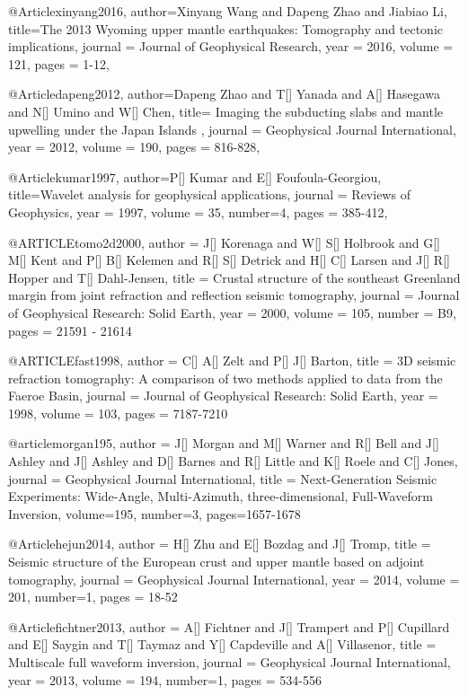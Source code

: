 @Article{xinyang2016,
  author={Xinyang Wang and Dapeng Zhao and Jiabiao Li},
  title={The 2013 Wyoming upper mantle earthquakes: Tomography and tectonic implications},
  journal = 	 {Journal of Geophysical Research},
  year = 	 2016,
  volume =	 121,
  pages =	 {1-12},
}

@Article{dapeng2012,
  author={Dapeng Zhao and T[] Yanada and A[] Hasegawa and N[] Umino and W[] Chen},
  title={ Imaging the subducting slabs and mantle upwelling under the Japan Islands },
  journal = 	 {Geophysical Journal International},
  year = 	 2012,
  volume =	 190,
  pages =	 {816-828},
}


@Article{kumar1997,
  author={P[] Kumar and E[] Foufoula-Georgiou},
  title={Wavelet analysis for geophysical applications},
  journal = 	 {Reviews of Geophysics},
  year = 	 1997,
  volume =	 35,
  number=4,
  pages =	 {385-412},
}

@ARTICLE{tomo2d2000,
  author = {J[] Korenaga and W[] S[] Holbrook and G[] M[] Kent and P[] B[] Kelemen and R[] S[] Detrick and H[] C[] Larsen and J[] R[] Hopper and T[] Dahl-Jensen},
  title = {Crustal structure of the southeast Greenland margin from joint refraction and reflection seismic tomography},
  journal = {Journal of Geophysical Research: Solid Earth},
  year = {2000},
  volume = {105},
  number = B9,
  pages = {21591 - 21614}
}

@ARTICLE{fast1998,
  author = {C[] A[] Zelt and P[] J[] Barton},
  title = {3D seismic refraction tomography: A comparison of two methods applied to data from the Faeroe Basin},
  journal = {Journal of Geophysical Research: Solid Earth},
  year = {1998},
  volume = {103},
  pages = {7187-7210}
}


@article{morgan195,
author = {J[] Morgan and M[] Warner and R[] Bell and J[] Ashley and J[] Ashley and D[] Barnes and R[] Little and K[] Roele and C[] Jones},
journal = {Geophysical Journal International},
title = {Next-Generation Seismic Experiments: Wide-Angle, Multi-Azimuth, three-dimensional, Full-Waveform Inversion},
volume=195,
number=3,
pages=1657-1678
}

@Article{hejun2014,
  author = 	 {H[] Zhu and E[] Bozdag and J[] Tromp},
  title = 	 {Seismic structure of the European crust and upper mantle based on adjoint tomography},
  journal = 	 {Geophysical Journal International},
  year = 	 2014,
  volume = 201,
  number=1,
  pages =	 {18-52}
}

@Article{fichtner2013,
  author = 	 {A[] Fichtner and J[] Trampert and P[] Cupillard and E[] Saygin and T[] Taymaz and Y[] Capdeville and A[] Villasenor},
  title = 	 {Multiscale full waveform inversion},
  journal = 	 {Geophysical Journal International},
  year = 	 2013,
  volume = 194,
  number=1,
  pages =	 {534-556}
}

